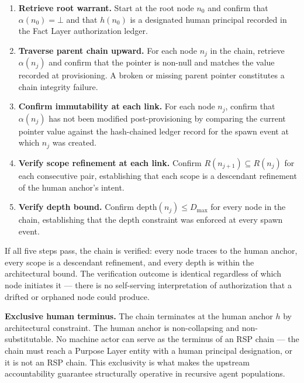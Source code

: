 \begin{enumerate}
    \item[(V1)] \textbf{Retrieve root warrant.} Start at the root node $n_0$ and confirm that $\alpha(n_0) = \bot$ and that $h(n_0)$ is a designated human principal recorded in the Fact Layer authorization ledger.

    \item[(V2)] \textbf{Traverse parent chain upward.} For each node $n_j$ in the chain, retrieve $\alpha(n_j)$ and confirm that the pointer is non-null and matches the value recorded at provisioning. A broken or missing parent pointer constitutes a chain integrity failure.

    \item[(V3)] \textbf{Confirm immutability at each link.} For each node $n_j$, confirm that $\alpha(n_j)$ has not been modified post-provisioning by comparing the current pointer value against the hash-chained ledger record for the spawn event at which $n_j$ was created.

    \item[(V4)] \textbf{Verify scope refinement at each link.} Confirm $R(n_{j+1}) \subseteq R(n_j)$ for each consecutive pair, establishing that each scope is a descendant refinement of the human anchor's intent.

    \item[(V5)] \textbf{Verify depth bound.} Confirm $\text{depth}(n_j) \leq D_{\max}$ for every node in the chain, establishing that the depth constraint was enforced at every spawn event.
\end{enumerate}

If all five steps pass, the chain is verified: every node traces to the human anchor, every scope is a descendant refinement, and every depth is within the architectural bound. The verification outcome is identical regardless of which node initiates it — there is no self-serving interpretation of authorization that a drifted or orphaned node could produce.

\medskip
\noindent\textbf{Exclusive human terminus.} The chain terminates at the human anchor $h$ by architectural constraint. The human anchor is non-collapsing and non-substitutable. No machine actor can serve as the terminus of an RSP chain — the chain must reach a Purpose Layer entity with a human principal designation, or it is not an RSP chain. This exclusivity is what makes the \bxthree{} upstream accountability guarantee structurally operative in recursive agent populations.

